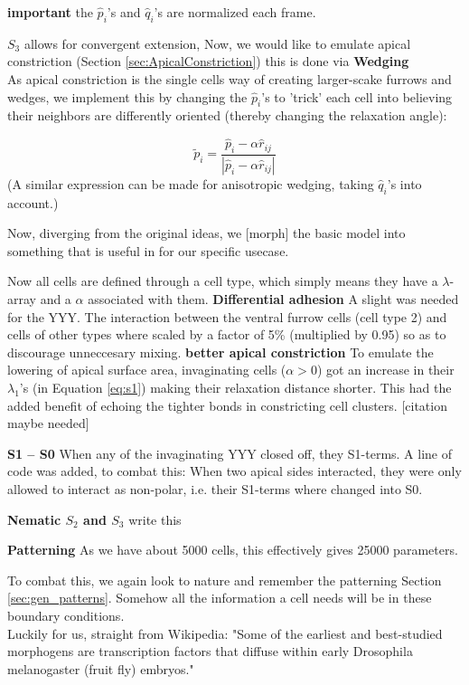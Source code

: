\textbf{important} the $\hat{p}_i$'s and $\hat{q}_i$'s are normalized each frame.




$S_3$ allows for convergent extension, Now, we would like to emulate apical constriction (Section \ref{sec:ApicalConstriction}) this is done via \textbf{Wedging}\\




As apical constriction is the single cells way of creating larger-scake furrows and wedges, we implement this by changing the $\hat{p}_i$'s to 'trick' each cell into believing their neighbors are differently oriented (thereby changing the relaxation angle):

\begin{equation}
    \tilde{{p}}_i = \frac{\hat{p}_i-\alpha \widehat{{r}}_{i j}}{|\hat{p}_i-\alpha \widehat{{r}}_{i j}|} 
\end{equation}
(A similar expression can be made for anisotropic wedging, taking  $\hat{q}_i$'s into account.)

Now, diverging from the original ideas, we [morph] the basic model into something that is useful in for our specific usecase.

Now all cells are defined through a cell type, which simply means they have a $\lambda$-array and a $\alpha$ associated with them.
\textbf{Differential adhesion}
A slight was needed for the YYY. The interaction between the ventral furrow cells (cell type 2) and cells of other types where scaled by a factor of 5\% (multiplied by 0.95) so as to discourage unneccesary mixing. 
\textbf{better apical constriction}
To emulate the lowering of apical surface area, invaginating cells ($\alpha > 0$) got an increase in their $\lambda_1$'s (in Equation \ref{eq:s1}) making their relaxation distance shorter. This had the added benefit of echoing the tighter bonds in constricting cell clusters. [citation maybe needed]

\textbf{S1 -- S0}
When any of the invaginating YYY closed off, they S1-terms. A line of code was added, to combat this: When two apical sides interacted, they were only allowed to interact as non-polar, i.e. their S1-terms where changed into S0.


\textbf{Nematic $S_2$ and $S_3$} write this

\textbf{Patterning}
As we have about 5000 cells, this effectively gives 25000 parameters.

To combat this, we again look to nature and remember the patterning Section \ref{sec:gen_patterns}. Somehow all the information a cell needs will be in these boundary conditions.\\
Luckily for us, straight from Wikipedia:
"Some of the earliest and best-studied morphogens are transcription factors that diffuse within early Drosophila melanogaster (fruit fly) embryos."


